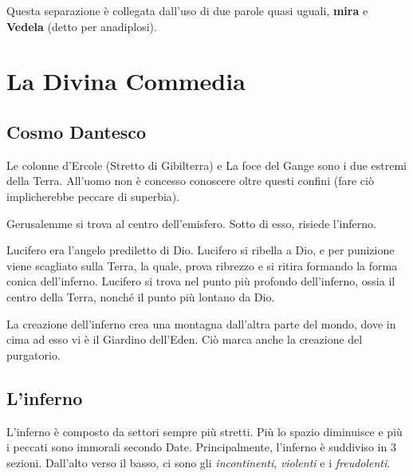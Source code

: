 \documentclass[a4paper]{article}
\begin{document}
Questa separazione è collegata dall'uso di due parole quasi uguali,
\textbf{mira} e \textbf{Vedela} (detto per anadiplosi).



\pagebreak

\section{La Divina Commedia}

\subsection{Cosmo Dantesco}


Le colonne d'Ercole (Stretto di Gibilterra) e La foce del Gange
sono i due estremi della Terra. All'uomo non è concesso conoscere oltre questi confini
(fare ciò implicherebbe peccare di superbia).

Gerusalemme si trova al centro dell'emisfero. Sotto di esso, risiede l'inferno.

Lucifero era l'angelo prediletto di Dio.
Lucifero si ribella a Dio, e per punizione viene scagliato sulla Terra, la quale,
prova ribrezzo e si ritira formando la forma conica dell'inferno. Lucifero si trova nel punto
più profondo dell'inferno, ossia il centro della Terra, nonché il punto più lontano da Dio.

La creazione dell'inferno crea una montagna dall'altra parte del mondo, dove in cima ad esso
vi è il Giardino dell'Eden. Ciò marca anche la creazione del purgatorio.

\subsection{L'inferno}

L'inferno è composto da settori sempre più stretti. Più lo spazio diminuisce e più i peccati sono immorali
secondo Date.
Principalmente, l'inferno è suddiviso in 3 sezioni.
Dall'alto verso il basso, ci sono gli \textit{incontinenti}, \textit{violenti} e
i \textit{freudolenti}.
\end{document}

